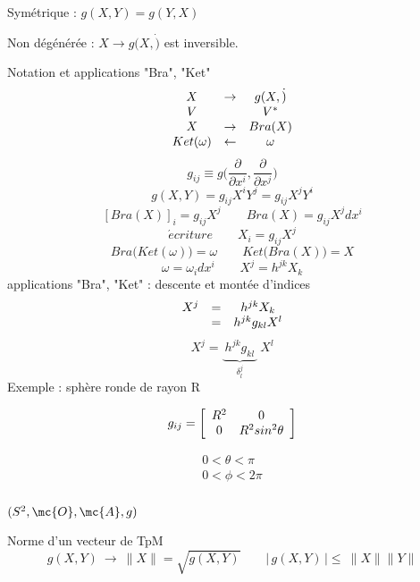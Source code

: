 Symétrique : $g(X,Y)=g(Y,X)$

Non dégénérée : $X\to g(X,\dot)$ est inversible.

Notation et applications "Bra", "Ket"
\[
\begin{array}{ c c c }
 X & \to & g(X,\dot) \\ V &  & V^* \\ X & \to & Bra(X) \\
 Ket(\omega) & \gets & \omega \\
\end{array}
\]
\[
g_{ij}\equiv g\big(\frac{\partial}{\partial x^i},\frac{\partial}{\partial x^j}\big)
\]
\[
g(X,Y)=g_{ij}X^iY^j=g_{ij}X^jY^i
\]
\[
[Bra(X)]_i=g_{ij}X^j \qquad\boxed{Bra(X)=g_{ij}X^jdx^i}
\]
\[
\acute{e}criture \qquad\boxed{X_i=g_{ij}X^j}
\]
\[
Bra\big(Ket(\omega)\big) = \omega \qquad Ket\big(Bra(X)\big) =X
\]
\[
\omega=\omega_idx^i \qquad X^j=h^{jk}X_k
\]
applications "Bra", "Ket" : descente et montée d'indices
\[
\begin{array}{ c c c }
 X^j & = & h^{jk}X_k \\   & = & h^{jk}g_{kl}X^l \\
\end{array}
\]
\[
 X^j = \underbrace{\ h^{jk}g_{kl}\ }_{\displaystyle\delta^j_l}\ X^l
\]
Exemple : sphère ronde de rayon R

\begin{minipage}[c]{.45\linewidth}
\[
g_{ij}=\left[
\begin{array}{ c c }
 R^2 & 0  \\ 0 & R^2sin^2\theta \\
\end{array}
\right]
\]
\end{minipage}
\hfill
\begin{minipage}[c]{.45\linewidth}
\[
\begin{array}{ c }
0<\theta<\pi  \\
0<\phi<2\pi  \\
\end{array}
\]
\end{minipage}
$(S^2, \mc{O}, \mc{A}, g)$

Norme d'un vecteur de TpM
\[
g(X,Y)\ \to\ \parallel X\parallel=\sqrt{g(X,Y)} \qquad 
|\,g(X,Y)\,|\leqslant\ \parallel X \parallel \parallel Y\parallel
\]


